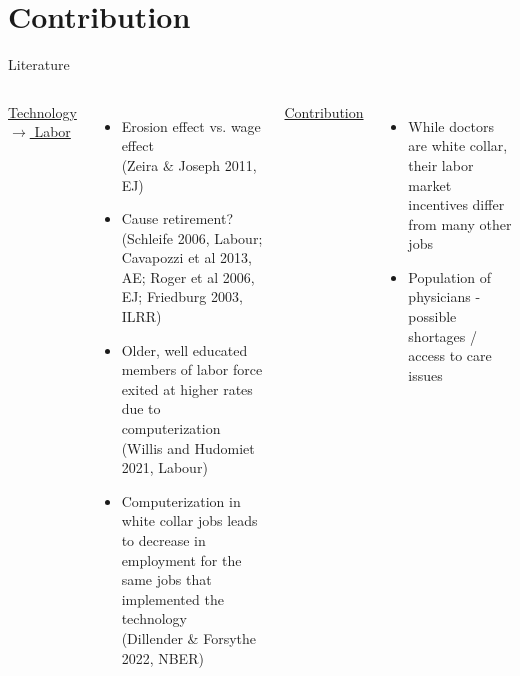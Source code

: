 \documentclass[10pt]{beamer}
\begin{document}
\section{Contribution}

\begin{frame}{Literature}
\small
\begin{columns}
\setlength{\tabcolsep}{-5pt}
        \centering
        \underline{ Technology $\rightarrow$ Labor }
        \vspace{-1mm}
        \begin{itemize}
            \item Erosion effect vs. wage effect \\ \vspace{1mm}
            \tiny (Zeira $\&$ Joseph 2011, EJ)
            
            \footnotesize
            
            \item Cause retirement? \\ \vspace{1mm}
            \tiny (Schleife 2006, Labour; Cavapozzi et al 2013, AE; Roger et al 2006, EJ; Friedburg 2003, ILRR)
            
            \footnotesize
            
            \item Older, well educated members of labor force exited at higher rates due to computerization \\ \vspace{1mm}
            \tiny (Willis and Hudomiet 2021, Labour)
            
            \footnotesize 
            
            \item Computerization in white collar jobs leads to decrease in employment for the same jobs that implemented the technology \\ \vspace{1mm}
            \tiny (Dillender & Forsythe 2022, NBER)
        \end{itemize}
        
        
        \centering
        
        \pause
        
        \color{blue}
        \underline{ Contribution }
        
        \vspace{1mm}
 
            \begin{itemize}
            \color{blue}
                \item While doctors are white collar, their labor market incentives differ from many other jobs
                \item Population of physicians - possible shortages / access to care issues
            \end{itemize}

        
\end{columns}
\end{frame}
\end{document}
